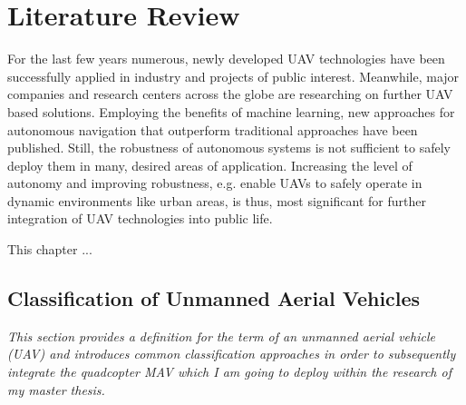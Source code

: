 
\chapter{Literature Review} \label{Chapter2}

For the last few years
numerous, newly developed
UAV technologies have been
successfully applied in 
industry and
projects of public interest.
Meanwhile, 
major companies and
research centers across the globe
are researching on further UAV based solutions.
Employing the benefits of machine learning, 
new approaches for autonomous navigation
that outperform traditional approaches 
have been published.
Still, the robustness
of autonomous systems 
is not sufficient to
safely deploy them in many, desired
areas of application. 
Increasing the level of autonomy and
improving robustness,
e.g. enable UAVs to safely operate in 
dynamic environments like urban areas,
is thus, most significant
for further 
integration of
UAV technologies
into public life.

This chapter ...



\section{Classification of Unmanned Aerial Vehicles} \label{Chapter2Section1}

\textit{This section provides a definition 
for the term of an unmanned aerial vehicle (UAV)
and introduces common classification approaches
in order to subsequently integrate the
quadcopter MAV 
which I am going to deploy 
within the research of my master thesis.}

